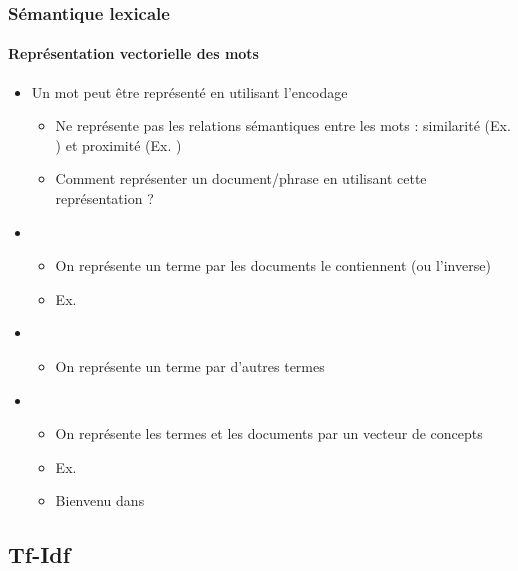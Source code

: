 \documentclass[xcolor=table]{beamer}
\begin{document}
\begin{frame}
\frametitle{Sémantique lexicale}
\framesubtitle{Représentation vectorielle des mots}

\begin{itemize}
	\item Un mot peut être représenté en utilisant l'encodage  
	\begin{itemize}
		\item Ne représente pas les relations sémantiques entre les mots : similarité (Ex. ) et proximité (Ex. )
		\item Comment représenter un document/phrase en utilisant cette représentation ?
	\end{itemize}

	\item {}
	\begin{itemize}
		\item On représente un terme par les documents le contiennent (ou l'inverse)
		\item Ex. 
	\end{itemize}

	\item {}
	\begin{itemize}
		\item On représente un terme par d'autres termes
	\end{itemize}

	\item {}
	\begin{itemize}
		\item On représente les termes et les documents par un vecteur de concepts
		\item Ex. 
		\item Bienvenu dans 
	\end{itemize}

\end{itemize}

\end{frame}


\subsection{Tf-Idf}
\end{document}

